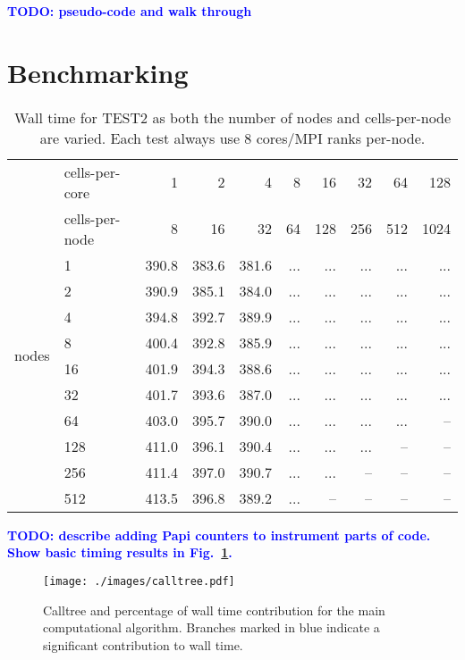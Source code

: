 \documentclass[11pt,a4paper]{article}
\newcommand{\todo}[1]{\textbf{\textcolor{Blue}{TODO: #1}}} %
\newcommand{\fig}[1]{Fig.~\ref{#1}} %
\begin{document}
\todo{pseudo-code and walk through}

\section{Benchmarking}
\begin{table}[htp!]
    \centering
\begin{tabular}{l|l|rrrrrrrr}
\multirow{2}{*}{}
& cells-per-core  &    1  & 2     & 4     & 8  & 16  & 32  & 64  & 128 \\
& cells-per-node  &    8  & 16    & 32    & 64 & 128 & 256 & 512 & 1024 \\
\hline
\multirow{8}{*}{nodes}
&1                & 390.8 & 383.6 & 381.6 & ... & ... & ... & ... & ... \\
&2                & 390.9 & 385.1 & 384.0 & ... & ... & ... & ... & ... \\
&4                & 394.8 & 392.7 & 389.9 & ... & ... & ... & ... & ... \\
&8                & 400.4 & 392.8 & 385.9 & ... & ... & ... & ... & ... \\
&16               & 401.9 & 394.3 & 388.6 & ... & ... & ... & ... & ... \\
&32               & 401.7 & 393.6 & 387.0 & ... & ... & ... & ... & ... \\
&64               & 403.0 & 395.7 & 390.0 & ... & ... & ... & ... & --  \\
&128              & 411.0 & 396.1 & 390.4 & ... & ... & ... & --  & --  \\
&256              & 411.4 & 397.0 & 390.7 & ... & ... & --  & --  & --  \\
&512              & 413.5 & 396.8 & 389.2 & ... & --  & --  & --  & --  \\
\end{tabular}
\label{tbl:test2scaling}
\caption{Wall time for TEST2 as both the number of nodes and cells-per-node are varied. Each test always use 8 cores/MPI ranks per-node.}
\end{table}

\todo{describe adding Papi counters to instrument parts of code. Show basic timing results in \fig{fig:calltree}.}

\begin{figure}[htp!]
\centering
\texttt{[image: ./images/calltree.pdf]}
\caption{Calltree and percentage of wall time contribution for the main computational algorithm. Branches marked in blue indicate a significant contribution to wall time.}
\label{fig:calltree}
\end{figure}
\end{document}
